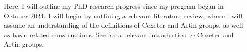 Here, I will outline my PhD research progress since my program began in October 2024.
I will begin by outlining a relevant literature review, where I will assume an understanding of the definitions of Coxeter and Artin groups, as well as basic related constructions.
See \cite{paolini_salvetti_kpi1_2021} for a relevant introduction to Coxeter and Artin groups.
